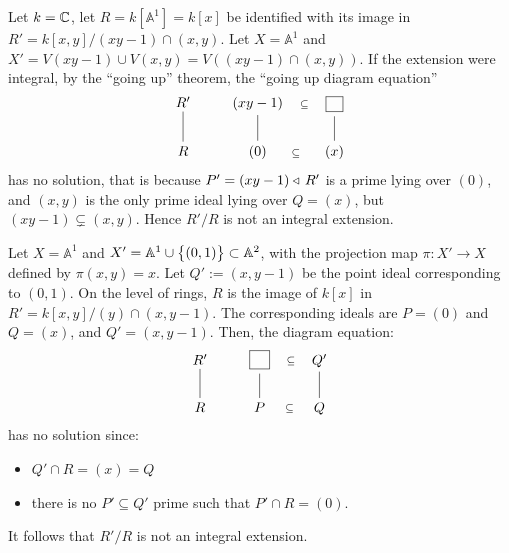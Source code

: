 \documentclass[11pt,a4paper]{article}
\newcommand{\A}{\mathbb A}
\begin{document}
\begin{example}
  Let $k = \mathbb{C}$, let $R = k[\A^1] = k[x]$ be identified with its image
  in $R' = k[x,y]/(xy-1) \cap (x,y)$.
  Let $X = \A^1$ and $X' = V(xy-1) \cup V(x,y) = V((xy-1) \cap (x,y))$.
  If the extension were integral, by the ``going up'' theorem,
  the ``going up diagram equation''
  \[\begin{tikzcd}[ampersand replacement=\&,cramped]
	{R'} \& {(xy-1)} \& {\boxed{\phantom{x}}} \\
	R \& {(0)} \& {(x)}
	\arrow["\subseteq", shift right=2.6, draw=none, from=1-2, to=1-3]
	\arrow[no head, from=1-3, to=2-3]
	\arrow[no head, from=2-1, to=1-1]
	\arrow[no head, from=2-2, to=1-2]
	\arrow["\subseteq", shift right=2.6, draw=none, from=2-2, to=2-3]
\end{tikzcd}\]
  has no solution,
  that is because $P' = (xy - 1) \triangleleft\, R'$ is a prime lying over $(0)$,
  and $(x,y)$ is the only prime ideal lying over $Q = (x)$,
  but $(xy - 1) \subsetneq (x,y)$.
  Hence $R'/R$ is not an integral extension.
\end{example}

\begin{example}
  Let $X = \A^1$ and $X' = \A^1 \cup \set{(0,1)} \subset \A^2$,
  with the projection map $\pi \colon X' \to X$ defined by $\pi(x,y) = x$.
  Let $Q' := (x,y-1)$ be the point ideal corresponding to $(0,1)$.
  On the level of rings, $R$ is the image of
  $k[x]$ in $R' = k[x,y]/(y) \cap (x,y-1)$.
  The corresponding ideals are $P = (0)$ and $Q = (x)$,
  and $Q' = (x,y-1)$.
  Then, the diagram equation:
  \[\begin{tikzcd}[ampersand replacement=\&,cramped]
    {R'} \& {\boxed{\phantom{P}}} \& {Q'} \\
	R \& P \& Q
	\arrow["\subseteq", shift right=2.2, draw=none, from=1-2, to=1-3]
	\arrow[no head, from=2-1, to=1-1]
	\arrow[no head, from=2-2, to=1-2]
	\arrow["\subseteq", shift right=2.2, draw=none, from=2-2, to=2-3]
	\arrow[no head, from=2-3, to=1-3]
\end{tikzcd}\]
  has no solution since:
  \begin{itemize}
    \item $Q' \cap R = (x) = Q$
    \item there is no $P' \subseteq Q'$ prime such that $P' \cap R = (0)$.
  \end{itemize}
  It follows that $R'/R$ is not an integral extension.
\end{example}
\end{document}
